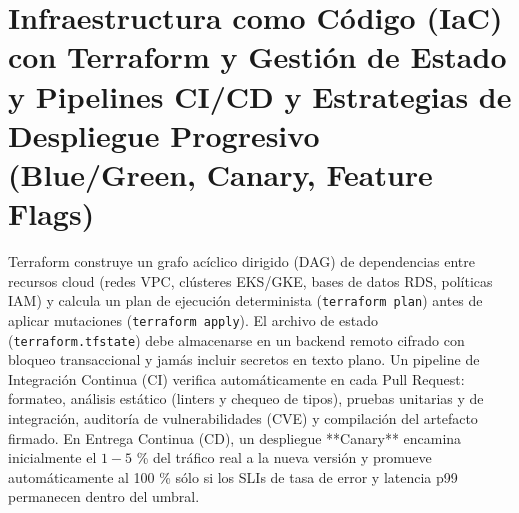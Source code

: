 \documentclass{book}
\begin{document}
\section{Infraestructura como Código (IaC) con Terraform y Gestión de Estado y Pipelines CI/CD y Estrategias de Despliegue Progresivo (Blue/Green, Canary, Feature Flags)}

Terraform construye un grafo acíclico dirigido (DAG) de dependencias entre recursos cloud (redes VPC, clústeres EKS/GKE, bases de datos RDS, políticas IAM) y calcula un plan de ejecución determinista (\texttt{terraform plan}) antes de aplicar mutaciones (\texttt{terraform apply}). El archivo de estado (\texttt{terraform.tfstate}) debe almacenarse en un backend remoto cifrado con bloqueo transaccional y jamás incluir secretos en texto plano.
Un pipeline de Integración Continua (CI) verifica automáticamente en cada Pull Request: formateo, análisis estático (linters y chequeo de tipos), pruebas unitarias y de integración, auditoría de vulnerabilidades (CVE) y compilación del artefacto firmado. En Entrega Continua (CD), un despliegue **Canary** encamina inicialmente el \(1-5\) \% del tráfico real a la nueva versión y promueve automáticamente al 100 \% sólo si los SLIs de tasa de error y latencia p99 permanecen dentro del umbral.
\end{document}
